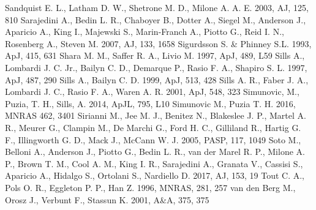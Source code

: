 \documentclass[useAMS,usenatbib]{mnras}
\begin{document}
\begin{thebibliography}{99}
 Sandquist E. L., Latham D. W., Shetrone M. D., Milone A. A. E. 2003, AJ, 125, 810
  Sarajedini A., Bedin L. R., Chaboyer B., Dotter  A., Siegel M.,
  Anderson J., Aparicio A., King I., Majewski S., Marin-Franch A.,
  Piotto G., Reid  I. N., Rosenberg A., Steven M. 2007, AJ, 133, 1658
 Sigurdsson S. \& Phinney S.L. 1993, ApJ, 415, 631 
 Shara M. M., Saffer R. A., Livio M. 1997,
  ApJ, 489, L59
 Sills A., Lombardi J. C. Jr.,
Bailyn C. D., Demarque P., Rasio F. A., Shapiro S. L. 1997, ApJ, 487, 290
 Sills A., Bailyn C. D. 1999,
  ApJ, 513, 428
 Sills A. R., Faber J. A.,
  Lombardi J. C., Rasio F. A., Waren A. R. 2001, ApJ, 548, 323
 Simunovic, M., Puzia, T. H., Sills, A. 2014, ApJL, 795, L10
 Simunovic M., Puzia T. H. 2016, MNRAS 462, 3401
 Sirianni M., Jee M. J., Benitez N., Blakeslee J. P., Martel A. R., Meurer G., Clampin M., De Marchi G., Ford H. C., Gilliland R., Hartig G. F., Illingworth G. D., Mack J., McCann W. J. 2005, PASP, 117, 1049
 Soto M., Belloni A., Anderson J., Piotto G., Bedin L. R., van der Marel R. P., Milone A. P., Brown T. M., Cool A. M., King I. R., Sarajedini A., Granata V., Cassisi S., Aparicio A., Hidalgo S., Ortolani S., Nardiello D. 2017, AJ, 153, 19
 Tout C. A., Pols O. R., Eggleton P. P., Han Z. 1996, MNRAS, 281, 257
 van den Berg M., Orosz J., Verbunt F., Stassun K. 2001, A\&A, 375, 375

\end{thebibliography}
\end{document}
